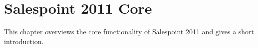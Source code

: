 \newpage
\chapter{Salespoint 2011 Core}
This chapter overviews the core functionality of Salespoint 2011 and gives a short introduction.











